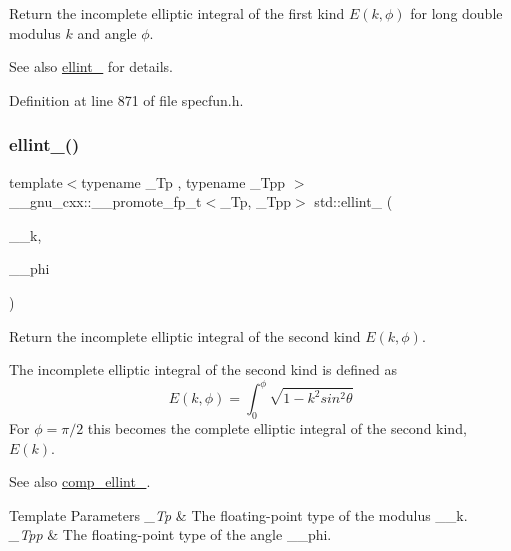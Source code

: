 Return the incomplete elliptic integral of the first kind $ E(k,\phi) $ for {\ttfamily long double} modulus $ k $ and angle $ \phi $.

\begin{DoxySeeAlso}{See also}
\hyperlink{group__tr29124__math__spec__func_ga8be90518215c6209679785e5444ee0af}{ellint\+\_} for details. 
\end{DoxySeeAlso}


Definition at line 871 of file specfun.\+h.

\mbox{\label{group__tr29124__math__spec__func_ga6db0d1043cad03894edb7def7b70bc39}} 
\subsubsection{\texorpdfstring{ellint\+\_()}{ellint\_2()}}
{\footnotesize\ttfamily template$<$typename \+\_\+\+Tp , typename \+\_\+\+Tpp $>$ \\
\+\_\+\+\_\+gnu\+\_\+cxx\+::\+\_\+\+\_\+promote\+\_\+fp\+\_\+t$<$\+\_\+\+Tp, \+\_\+\+Tpp$>$ std\+::ellint\+\_ (\begin{DoxyParamCaption}\item[{\+\_\+\+Tp}]{\+\_\+\+\_\+k,  }\item[{\+\_\+\+Tpp}]{\+\_\+\+\_\+phi }\end{DoxyParamCaption})\hspace{0.3cm}{\ttfamily [inline]}}

Return the incomplete elliptic integral of the second kind $ E(k,\phi) $.

The incomplete elliptic integral of the second kind is defined as \[ E(k,\phi) = \int_0^{\phi} \sqrt{1 - k^2 sin^2\theta} \] For $ \phi= \pi/2 $ this becomes the complete elliptic integral of the second kind, $ E(k) $. \begin{DoxySeeAlso}{See also}
\hyperlink{group__tr29124__math__spec__func_gacd0057c6937200dc296c98d7e53f5112}{comp\+\_\+ellint\+\_}.
\end{DoxySeeAlso}

\begin{DoxyTemplParams}{Template Parameters}
{\em \+\_\+\+Tp} & The floating-\/point type of the modulus {\ttfamily \+\_\+\+\_\+k}. \\
\hline
{\em \+\_\+\+Tpp} & The floating-\/point type of the angle {\ttfamily \+\_\+\+\_\+phi}. \\
\hline
\end{DoxyTemplParams}

